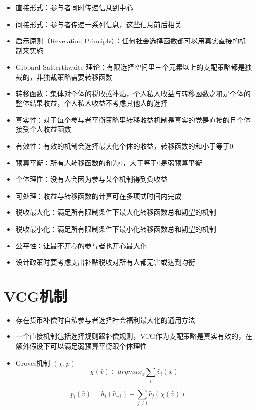 \documentclass[
]{book}
\providecommand{\tightlist}{%
  \setlength{\itemsep}{0pt}\setlength{\parskip}{0pt}}
\begin{document}
\begin{itemize}
\tightlist
\item
  直接形式：参与者同时传递信息到中心
\item
  间接形式：参与者传递一系列信息，这些信息前后相关
\item
  启示原则（Revelation Principle）：任何社会选择函数都可以用真实直接的机制来实施
\item
  Gibbard-Satterthwaite 理论：有限选择空间里三个元素以上的支配策略都是独裁的，非独裁策略需要转移函数
\item
  转移函数：集体对个体的税收或补贴，个人私人收益与转移函数之和是个体的整体结果收益，个人私人收益不考虑其他人的选择
\item
  真实性：对于每个参与者平衡策略里转移收益机制是真实的党是直接的且个体接受个人收益函数
\item
  有效性：有效的机制会选择最大化个体的收益，转移函数的和小于等于0
\item
  预算平衡：所有人转移函数的和为0，大于等于0是弱预算平衡
\item
  个体理性：没有人会因为参与某个机制得到负收益
\item
  可处理：收益与转移函数的计算可在多项式时间内完成
\item
  税收最大化：满足所有限制条件下最大化转移函数总和期望的机制
\item
  税收最小化：满足所有限制条件下最小化转移函数总和期望的机制
\item
  公平性：让最不开心的参与者也开心最大化
\item
  设计政策时要考虑支出补贴税收对所有人都无害或达到均衡
\end{itemize}

\hypertarget{vcgux673aux5236}{%
\section{VCG机制}\label{vcgux673aux5236}}

\begin{itemize}
\tightlist
\item
  存在货币补偿时自私参与者选择社会福利最大化的通用方法
\item
  一个直接机制包括选择规则跟补偿规则，VCG作为支配策略是真实有效的，在额外假设下可以满足弱预算平衡跟个体理性
\item
  Groves机制 \((\chi,p)\)
  \[\chi (\hat v) \in arg max_x \sum_i \hat v_i(x)\]
\end{itemize}

\[p_i(\hat v) = h_i(\hat v_{-i}) - \sum_{j\neq i} \hat v_j(\chi(\hat v))\]
\end{document}
